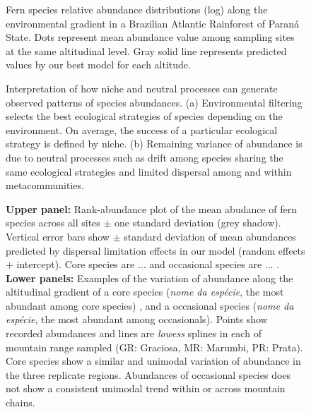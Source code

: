 \documentclass[12pt]{article}
\begin{document}
\begin{figure}[!ht]
 \begin{center}
\end{center}
\caption{Fern species relative abundance distributions (log) along the environmental gradient in a Brazilian Atlantic Rainforest of Paran\'a State. Dots represent mean abundance value among sampling sites at the same altitudinal level. Gray solid line represents predicted values by our best model for each altitude.}\label{sads}
\end{figure}

\begin{figure}[!ht]
 \begin{center}
\end{center}
\caption{Interpretation of how niche and neutral processes can generate observed patterns of species abundances. (a) Environmental filtering selects the best ecological strategies of species depending on the environment. On average, the success of a particular ecological strategy is defined by niche. (b) Remaining variance of abundance is due to neutral processes such as drift among species sharing the same ecological strategies and limited dispersal among and within metacommunities.} \label{final}
\end{figure}

\begin{figure}[!ht]
 \begin{center}
\end{center}
\caption{\textbf{Upper panel:} Rank-abundance plot of the mean abudance of fern species across all sites $\pm$ one standard deviation (grey shadow). Vertical error bars show $\pm$ standard deviation of mean abundances predicted by dispersal limitation effects in our model (random effects $+$ intercept). Core species are ... and occasional species are ... . \textbf{Lower panels:} Examples of the variation of abundance along the altitudinal gradient of a core species (\emph{nome da espécie}, the most abundant among core species) , and a occasional species (\emph{nome da espécie}, the most abundant among occasionals). Points show recorded abundances and lines are \emph{lowess} splines in each of mountain range sampled (GR: Graciosa, MR: Marumbi, PR: Prata). Core species show a similar and unimodal variation of abundance in the three replicate regions. Abundances of occasional species does not show a consistent unimodal trend within or across mountain chains.}
\label{fig:radmeta}
\end{figure}


\newpage
\end{document}
